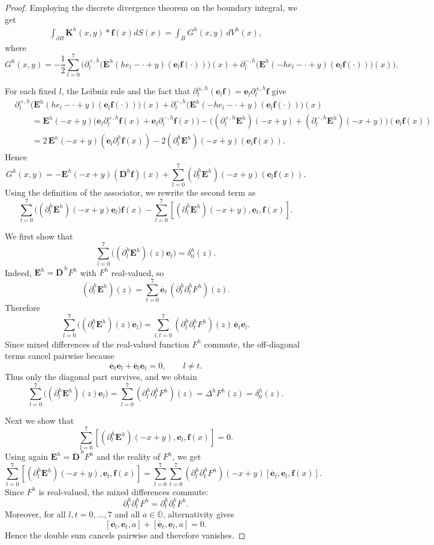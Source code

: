 \documentclass{amsart}
\theoremstyle{definition}
\theoremstyle{remark}
\numberwithin{equation}{section}
\newcommand{\p}{\partial}
\newcommand{\OO}{\mathbb O}
\newcommand{\f}{\bm{f}}
\newcommand{\e}{\bm{e}}
\newcommand{\E}{\bm{E}}
\begin{document}
         \begin{proof}
Employing the discrete divergence theorem on the boundary integral, we get
\begin{equation}\label{2023-09-08 09:07:56}
\begin{aligned}
 \int_{\p B}\bm K^h(x,y)*\f(x)dS(x)=  \int_B  G^h(x,y)\,dV^h(x),
\end{aligned}
\end{equation}
where
\[
G^h(x,y)= -\frac{1}{2} \sum\limits_{l=0}^7  \Bigg( \p_l^{+,h}\Big(\E^h(he_l-\cdot+y)(\e_l \f(\cdot))\Big)(x) +\p_l^{-,h}\Big(\E^h(-he_l-\cdot+y)(\e_l\f(\cdot))\Big)(x)\Bigg).
\]

For each fixed \(l\), the Leibniz rule and the fact that \( \p_l^{\pm,h}(\e_l\f)=\e_l\p_l^{\pm,h}\f \) give
\[
\begin{aligned}
&\p_l^{+,h}\Big(\E^h(he_l-\cdot+y)(\e_l \f(\cdot))\Big)(x)
+\p_l^{-,h}\Big(\E^h(-he_l-\cdot+y)(\e_l\f(\cdot))\Big)(x)\\
&\qquad=
\E^h(-x+y)\bigl(\e_l\p_l^{+,h}\f(x)+\e_l\p_l^{-,h}\f(x)\bigr)
-\bigl((\p_l^{+,h}\E^h)(-x+y)+(\p_l^{-,h}\E^h)(-x+y)\bigr)(\e_l\f(x))\\
&\qquad=
2\,\E^h(-x+y)(\e_l\p_l^h\f(x))-2(\p_l^h\E^h)(-x+y)(\e_l\f(x)).
\end{aligned}
\]
Hence
\[
G^h(x,y)
=- \E^h(-x+y)(\bm D^h \f)(x)+ \sum\limits_{l=0}^7 (\p_l^h\E^h)(-x+y)(\e_l \f(x)).
\]
Using the definition of the associator, we rewrite the second term as
\[
\sum_{l=0}^7 \bigl((\p_l^h\E^h)(-x+y)\e_l\bigr)\f(x)
-\sum_{l=0}^7[(\p_l^h\E^h)(-x+y),\e_l,\f(x)].
\]

We first show that
\begin{equation}
\label{eq:right-fundamental}
\sum_{l=0}^7 \bigl((\p_l^h\E^h)(z)\e_l\bigr)=\delta_0^h(z).
\end{equation}
Indeed, \(\E^h=\bm{\overline D}^{\,h}F^h\) with \(F^h\) real-valued, so
\[
(\p_l^h\E^h)(z)=\sum_{t=0}^7 \bm{\overline e}_t\,(\p_l^h\p_t^hF^h)(z).
\]
Therefore
\[
\sum_{l=0}^7 \bigl((\p_l^h\E^h)(z)\e_l\bigr)
=
\sum_{l,t=0}^7 (\p_l^h\p_t^hF^h)(z)\,\bm{\overline e}_t\e_l.
\]
Since mixed differences of the real-valued function \(F^h\) commute, the off-diagonal terms cancel pairwise because
\[
\bm{\overline e}_t\e_l+\bm{\overline e}_l\e_t=0,
\qquad l\neq t.
\]
Thus only the diagonal part survives, and we obtain
\[
\sum_{l=0}^7 \bigl((\p_l^h\E^h)(z)\e_l\bigr)
=
\sum_{l=0}^7(\p_l^h\p_l^hF^h)(z)
=
\Delta^h F^h(z)
=
\delta_0^h(z).
\]

Next we show that
\[
\sum\limits_{l=0}^7[(\p_l^h\E^h)(-x+y),\e_l,\f(x)]=0.
\]
Using again \(\E^h=\bm{\overline D}^{\,h}F^h\) and the reality of \(F^h\), we get
\[
\sum_{l=0}^7[(\p_l^h\E^h)(-x+y),\e_l,\f(x)]
=
\sum_{l=0}^7\sum_{t=0}^7(\p_l^h\p_t^hF^h)(-x+y)[\bm{\overline e}_t,\e_l,\f(x)].
\]
Since \(F^h\) is real-valued, the mixed differences commute:
\[
\p_l^h\p_t^hF^h=\p_t^h\p_l^hF^h.
\]
Moreover, for all \(l,t=0,\dots,7\) and all \(a\in\OO\), alternativity gives
\begin{equation}
    \label{2023-09-13 09:30:29}
    [\bm{\overline e}_l,\e_t,a]+[\bm{\overline e}_t,\e_l,a]=0.
\end{equation}
Hence the double sum cancels pairwise and therefore vanishes.


\end{proof}
\end{document}
